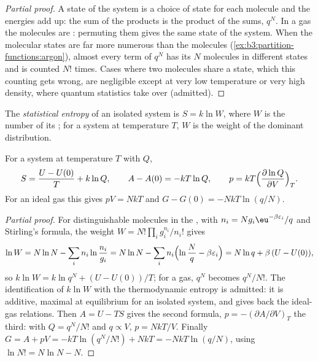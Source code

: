 \begin{proof}[Partial proof]
A state of the system is a choice of state for each molecule and the energies
add up: the sum of the products is the product of the sums, $q^N$. In a gas the
molecules are : permuting them gives the same state of the
system. When the molecular states are far more numerous than the molecules
(\cref{ex:b3:partition-functions:argon}), almost every term of $q^N$ has its $N$
molecules in different states and is counted $N!$ times. Cases where two
molecules share a state, which this counting gets wrong, are negligible except
at very low temperature or very high density, where quantum statistics take
over (admitted).
\end{proof}

\begin{definition}\label{def:b3:partition-functions:statistical-entropy}
The \emph{statistical entropy} of an isolated system is
$S = k\ln W$, where $W$ is the number of its ; for a system at
temperature $T$, $W$ is the weight of the dominant distribution.
\end{definition}

\begin{theorem}\label{thm:b3:partition-functions:entropy}
For a system at temperature $T$ with  $Q$,
\[
  S = \frac{U - U(0)}{T} + k\ln Q, \qquad A - A(0) = -kT\ln Q, \qquad
  p = kT\Bigl(\frac{\partial\ln Q}{\partial V}\Bigr)_T .
\]
For an ideal gas this gives $pV = NkT$ and $G - G(0) = -NkT\ln(q/N)$.
\end{theorem}

\begin{proof}[Partial proof]
For distinguishable molecules in the , with $n_i = Ng_i\eu^{-\beta\varepsilon_i}/q$
and Stirling's formula, the weight $W = N!\prod_ig_i^{n_i}/n_i!$ gives
\[
  \ln W = N\ln N - \sum_in_i\ln\frac{n_i}{g_i} = N\ln N - \sum_in_i\Bigl(\ln\frac Nq - \beta\varepsilon_i\Bigr)
        = N\ln q + \beta\,(U - U(0)),
\]
so $k\ln W = k\ln q^N + (U - U(0))/T$; for a gas, $q^N$ becomes $q^N/N!$. The
identification of $k\ln W$ with the thermodynamic entropy is admitted: it is
additive, maximal at equilibrium for an isolated system, and gives back the
ideal-gas relations. Then $A = U - TS$ gives the second formula, $p =
-(\partial A/\partial V)_T$ the third: with $Q = q^N/N!$ and $q \propto V$, $p = NkT/V$. Finally
$G = A + pV = -kT\ln(q^N/N!) + NkT = -NkT\ln(q/N)$, using $\ln N! = N\ln N - N$.
\end{proof}

